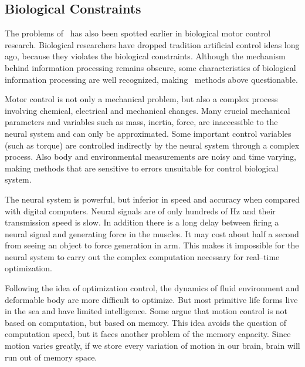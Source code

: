 \subsection{Biological Constraints}
The problems of \cms\ has also been spotted earlier in biological motor control research.
Biological researchers have dropped  tradition artificial control ideas long ago, because they  violates the biological constraints.
Although the mechanism behind information processing remains obscure, some characteristics of biological information processing are well recognized,  making  \cms\ methods above questionable\citep{Glynn2003}. 
  
\begin{itemize}
Motor control is not only a mechanical problem, but also a complex process involving chemical, electrical and mechanical changes.
Many crucial mechanical parameters and variables such as mass, inertia, force, are inaccessible to the neural system and can only be approximated. 
Some important control variables (such as torque) are controlled indirectly by the neural system through a complex process.
Also body and environmental measurements are noisy and time varying, making methods that are  sensitive to errors unsuitable for control biological system.

The neural system is powerful, but inferior in speed and accuracy when compared with digital computers. 
Neural signals are of only hundreds of Hz and their transmission speed is slow.
In addition there is a long delay between firing a neural signal and generating force in the muscles.
It may cost about half a second from seeing an object to force generation in arm. 
This makes it impossible for the neural system to carry out the complex computation necessary for real–time optimization.


Following the idea of optimization control, the dynamics of fluid environment and deformable body are more difficult to optimize. 
But most primitive life forms live in the sea and have limited intelligence. 
Some argue that motion control is not based on computation, but based on memory.
This idea avoids the question of computation speed, but it faces another problem of the memory capacity. 
Since motion varies greatly, if we store every variation of motion in our brain, brain will run out of memory space.

\end{itemize}

